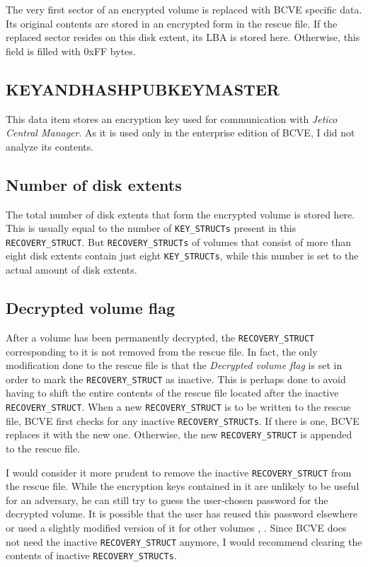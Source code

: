 \documentclass[thesis=B,english]{FITthesis}[2012/10/20]
\begin{document}
	The very first sector of an encrypted volume is replaced with BCVE specific data. Its original contents are stored in an encrypted form in the rescue file. If the replaced sector resides on this disk extent, its LBA is stored here. Otherwise, this field is filled with 0xFF bytes.
	
	\subsection{KEY\textunderscore{}AND\textunderscore{}HASH\textunderscore{}PUBKEY\textunderscore{}MASTER}
	
	This data item stores an encryption key used for communication with \textit{Jetico Central Manager}. As it is used only in the enterprise edition of BCVE, I did not analyze its contents.
	
	\subsection{Number of disk extents}
	
	The total number of disk extents that form the encrypted volume is stored here. This is usually equal to the number of \verb|KEY_STRUCTs| present in this \verb|RECOVERY_STRUCT|. But \verb|RECOVERY_STRUCTs| of volumes that consist of more than eight disk extents contain just eight \verb|KEY_STRUCTs|, while this number is set to the actual amount of disk extents.
	
	\subsection{Decrypted volume flag}
	
	After a volume has been permanently decrypted, the \verb|RECOVERY_STRUCT| corresponding to it is not removed from the rescue file. In fact, the only modification done to the rescue file is that the \textit{Decrypted volume flag} is set in order to mark the \verb|RECOVERY_STRUCT| as inactive. This is perhaps done to avoid having to shift the entire contents of the rescue file located after the inactive \verb|RECOVERY_STRUCT|. When a new \verb|RECOVERY_STRUCT| is to be written to the rescue file, BCVE first checks for any inactive \verb|RECOVERY_STRUCTs|. If there is one, BCVE replaces it with the new one. Otherwise, the new \verb|RECOVERY_STRUCT| is appended to the rescue file.
	
	I would consider it more prudent to remove the inactive \verb|RECOVERY_STRUCT| from the rescue file. While the encryption keys contained in it are unlikely to be useful for an adversary, he can still try to guess the user-chosen password for the decrypted volume. It is possible  that the user has reused this password elsewhere or used a slightly modified version of it for other volumes \cite{passwords1}, \cite{passwords2}. Since BCVE does not need the inactive \verb|RECOVERY_STRUCT| anymore, I would recommend clearing the contents of inactive \verb|RECOVERY_STRUCTs|.
	
\end{document}
